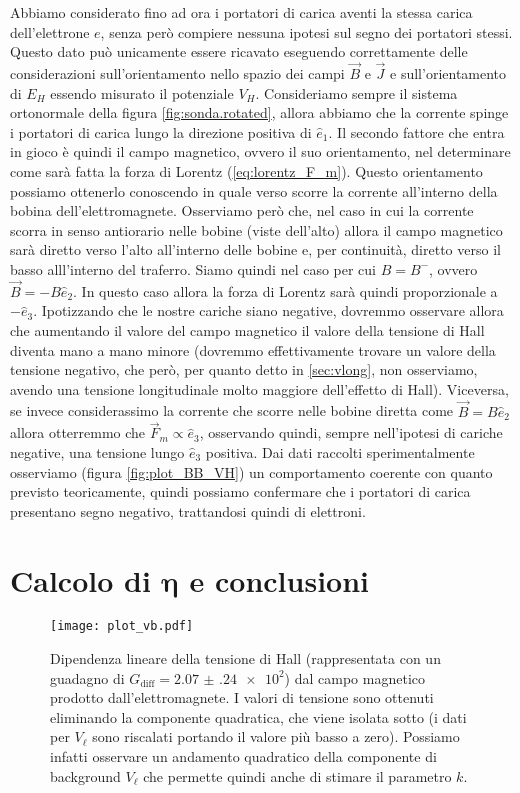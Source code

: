 \documentclass[
    prl,
    reprint, 
    superscriptaddress, 
    altaffilletter, 
    amsmath, 
    amssymb, 
    a4paper,
    varvw]{revtex4-2}
\begin{document}
Abbiamo considerato fino ad ora i portatori di carica aventi la stessa carica dell'elettrone $e$, senza però compiere nessuna ipotesi sul segno dei portatori stessi. Questo dato può unicamente essere ricavato eseguendo correttamente delle considerazioni sull'orientamento nello spazio dei campi $\vec{B}$ e $\vec{J}$ e sull'orientamento di $E_H$ essendo misurato il potenziale $V_H$. Consideriamo sempre il sistema ortonormale della figura \ref{fig:sonda.rotated}, allora abbiamo che la corrente spinge i portatori di carica lungo la direzione positiva di $\hat{e}_1$. Il secondo fattore che entra in gioco è quindi il campo magnetico, ovvero il suo orientamento, nel determinare come sarà fatta la forza di Lorentz (\ref{eq:lorentz_F_m}). Questo orientamento possiamo ottenerlo conoscendo in quale verso scorre la corrente all'interno della bobina dell'elettromagnete. Osserviamo però che, nel caso in cui la corrente scorra in senso antiorario nelle bobine (viste dell'alto) allora il campo magnetico sarà diretto verso l'alto all'interno delle bobine e, per continuità, diretto verso il basso alll'interno del traferro. Siamo quindi nel caso per cui $B=B^-$, ovvero $\vec{B} = -B\hat{e}_2$. In questo caso allora la forza di Lorentz sarà quindi proporzionale a $-\hat{e}_3$. Ipotizzando che le nostre cariche siano negative, dovremmo osservare allora che aumentando il valore del campo magnetico il valore della tensione di Hall diventa mano a mano minore (dovremmo effettivamente trovare un valore della tensione negativo, che però, per quanto detto in \ref{sec:vlong}, non osserviamo, avendo una tensione longitudinale molto maggiore dell'effetto di Hall). Viceversa, se invece considerassimo la corrente che scorre nelle bobine diretta come $\vec{B}=B\hat{e}_2$ allora otterremmo che $\vec{F}_m \propto \hat{e}_3$, osservando quindi, sempre nell'ipotesi di cariche negative, una tensione lungo $\hat{e}_3$ positiva. Dai dati raccolti sperimentalmente osserviamo (figura \ref{fig:plot_BB_VH}) un comportamento coerente con quanto previsto teoricamente, quindi possiamo confermare che i portatori di carica presentano segno negativo, trattandosi quindi di elettroni. 

\section{Calcolo di $\mathbf\eta$ e conclusioni}\label{sec:computing_eta_and_conlusion}

\begin{figure}
    \centering
    \texttt{[image: plot\_vb.pdf]}
    \caption{Dipendenza lineare della tensione di Hall (rappresentata con un guadagno di $G_\text{diff} = \num{2.07(24)e2}$) dal campo magnetico prodotto dall'elettromagnete. I valori di tensione sono ottenuti eliminando la componente quadratica, che viene isolata sotto (i dati per $V_\ell$ sono riscalati portando il valore più basso a zero). Possiamo infatti osservare un andamento quadratico della componente di background $V_\ell$ che permette quindi anche di stimare il parametro $k$.}\label{fig:plot_vb}
\end{figure}
\end{document}
